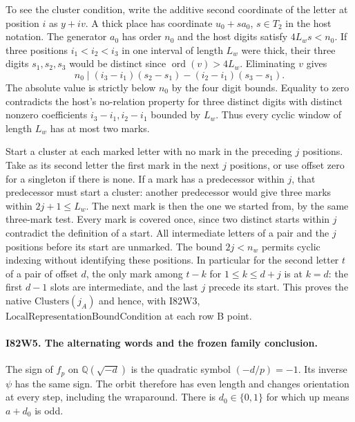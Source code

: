 To see the cluster condition, write the additive second coordinate
of the letter at position $i$ as $y+i v$. A thick place has
coordinate $u_0+s a_0$, $s\in T_2$ in the host notation.
The generator $a_0$ has order $n_0$ and the host digits satisfy
$4L_w s<n_0$. If three positions $i_1<i_2<i_3$ in one interval
of length $L_w$ were thick, their three digits $s_1,s_2,s_3$
would be distinct since $\operatorname{ord}(v)>4L_w$.
Eliminating $v$ gives
\[
 n_0\mid(i_3-i_1)(s_2-s_1)-(i_2-i_1)(s_3-s_1).
\]
The absolute value is strictly below $n_0$ by the four digit
bounds. Equality to zero contradicts the host's no-relation
property for three distinct digits with distinct nonzero
coefficients $i_3-i_1,i_2-i_1$ bounded by $L_w$.
Thus every cyclic window of length $L_w$ has at most two marks.

Start a cluster at each marked letter with no mark in the preceding
$j$ positions. Take as its second letter the first mark in the next
$j$ positions, or use offset zero for a singleton if there is none.
If a mark has a predecessor within $j$, that predecessor must start
a cluster: another predecessor would give three marks within
$2j+1\le L_w$. The next mark is then the one we started from, by
the same three-mark test. Every mark is covered once, since two
distinct starts within $j$ contradict the definition of a start.
All intermediate letters of a pair and the $j$ positions before
its start are unmarked. The bound $2j<n_w$ permits cyclic indexing
without identifying these positions. In particular for the second letter
$t$ of a pair of offset $d$, the only mark among $t-k$ for
$1\le k\le d+j$ is at $k=d$: the first $d-1$ slots are
intermediate, and the last $j$ precede its start. This proves the native
$\mathrm{Clusters}(j_A)$ and hence, with I82W3,
$\mathrm{LocalRepresentationBoundCondition}$ at each row B point.

\paragraph{I82W5. The alternating words and the frozen family conclusion.}
The sign of $f_p$ on $\mathbb Q(\sqrt{-d})$ is the quadratic
symbol $(-d/p)=-1$. Its inverse $\psi$ has the same sign. The
orbit therefore has even length and changes orientation at every
step, including the wraparound. There is $d_0\in\{0,1\}$ for
which up means $a+d_0$ is odd.

